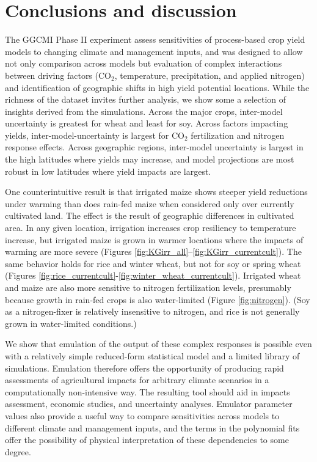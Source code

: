 \documentclass[preprint, 5p, times, twocolumn]{elsarticle}
\begin{document}
\section{Conclusions and discussion} 
\label{S:4}
The GGCMI Phase II experiment assess sensitivities of process-based crop yield models to changing climate and management inputs, and was designed to allow not only comparison across models but evaluation of complex interactions between driving factors (CO$_2$, temperature, precipitation, and applied nitrogen) and identification of geographic shifts in high yield potential locations. While the richness of the dataset invites further analysis, we show some a selection of insights derived from the simulations. Across the major crops, inter-model uncertainty is greatest for wheat and least for soy. Across factors impacting yields, inter-model-uncertainty is largest for CO$_2$ fertilization and nitrogen response effects. Across geographic regions, inter-model uncertainty is largest in the high latitudes where yields may increase, and model projections are most robust in low latitudes where yield impacts are largest.  

One counterintuitive result is that irrigated maize shows steeper yield reductions under warming than does rain-fed maize when considered only over currently cultivated land. The effect is the result of geographic differences in cultivated area. In any given location, irrigation increases crop resiliency to temperature increase, but irrigated maize is grown in warmer locations where the impacts of warming are more severe (Figures \ref{fig:KGirr_all}--\ref{fig:KGirr_currentcult}). The same behavior holds for rice and winter wheat, but not for soy or spring wheat (Figures \ref{fig:rice_currentcult}-\ref{fig:winter_wheat_currentcult}). Irrigated wheat and maize are also more sensitive to nitrogen fertilization levels, presumably because growth in rain-fed crops is also water-limited (Figure \ref{fig:nitrogen}). (Soy as a nitrogen-fixer is relatively insensitive to nitrogen, and rice is not generally grown in water-limited conditions.)

We show that emulation of the output of these complex responses is possible even with a relatively simple reduced-form statistical model and a limited library of simulations. Emulation therefore offers the opportunity of producing rapid assessments of agricultural impacts for arbitrary climate scenarios in a computationally non-intensive way. The resulting tool should aid in impacts assessment, economic studies, and uncertainty analyses. Emulator parameter values also provide a useful way to compare sensitivities across models to different climate and management inputs, and the terms in the polynomial fits offer the possibility of physical interpretation of these dependencies to some degree.
\end{document}
